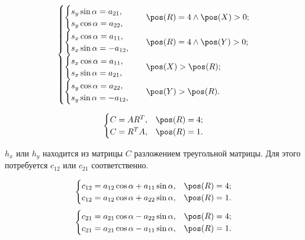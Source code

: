 $$\begin{cases}
	\begin{cases}
		s_y \sin\alpha = a_{21},\\
		s_y \cos\alpha = a_{22},
	\end{cases} & \pos(R) = 4 \wedge \pos(X)>0;\\
	\begin{cases}
		s_x \cos\alpha = a_{11},\\
		s_x \sin\alpha = - a_{12},
	\end{cases} & \pos(R) = 4 \wedge \pos(Y)>0;\\
	\begin{cases}
		s_x \cos\alpha = a_{11},\\
		s_x \sin\alpha = a_{21},
	\end{cases} & \pos(X) > \pos(R);\\
	\begin{cases}
		s_y \cos\alpha = a_{22},\\
		s_y \sin\alpha = - a_{12},
	\end{cases} & \pos(Y) > \pos(R).
\end{cases}$$

$$\begin{cases}
	C = A R^T, & \pos(R) = 4;\\
	C = R^T A, & \pos(R) = 1.
\end{cases}$$

$h_x$ или $h_y$ находится из матрицы $C$ разложением треугольной матрицы.
Для этого потребуется $c_{12}$ или $c_{21}$ соответственно.

$$\begin{cases}
	c_{12} = a_{12} \cos\alpha + a_{11} \sin\alpha, & \pos(R) = 4;\\
	c_{12} = a_{12} \cos\alpha + a_{22} \sin\alpha, & \pos(R) = 1.
\end{cases}$$
$$\begin{cases}
	c_{21} = a_{21} \cos\alpha - a_{22} \sin\alpha, & \pos(R) = 4;\\
	c_{21} = a_{21} \cos\alpha - a_{11} \sin\alpha, & \pos(R) = 1.
\end{cases}$$


